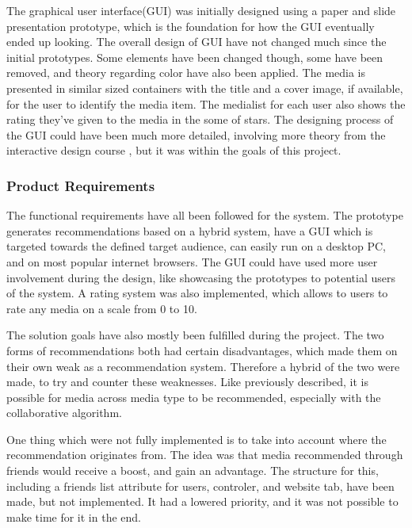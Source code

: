 The graphical user interface(GUI) was initially designed using a paper and slide presentation prototype, which is the foundation for how the GUI eventually ended up looking. The overall design of GUI have not changed much since the initial prototypes. Some elements have been changed though, some have been removed, and theory regarding color have also been applied. The media is presented in similar sized containers with the title and a cover image, if available, for the user to identify the media item. The medialist for each user also shows the rating they’ve given to the media in the some of stars. The designing process of the GUI could have been much more detailed, involving more theory from the interactive design course \cite{DEBBook}, but it was within the goals of this project.

\subsubsection{Product Requirements}

The functional requirements have all been followed for the system. The prototype generates recommendations based on a hybrid system, have a GUI which is targeted towards the defined target audience, can easily run on a desktop PC, and on most popular internet browsers. The GUI could have used more user involvement during the design, like showcasing the prototypes to potential users of the system. A rating system was also implemented, which allows to users to rate any media on a scale from 0 to 10.

The solution goals have also mostly been fulfilled during the project. The two forms of recommendations both had certain disadvantages, which made them on their own weak as a recommendation system. Therefore a hybrid of the two were made, to try and counter these weaknesses. Like previously described, it is possible for media across media type to be recommended, especially with the collaborative algorithm. 

One thing which were not fully implemented is to take into account where the recommendation originates from. The idea was that media recommended through friends would receive a boost, and gain an advantage. The structure for this, including a friends list attribute for users, controler, and website tab, have been made, but not implemented. It had a lowered priority, and it was not possible to make time for it in the end. 

